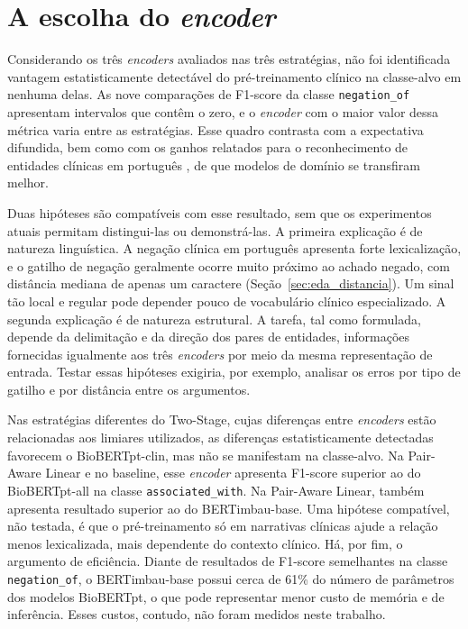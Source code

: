 \section{A escolha do \emph{encoder}}
\label{sec:discussao_encoder}

Considerando os três \emph{encoders} avaliados nas três estratégias, não foi identificada vantagem estatisticamente detectável do pré-treinamento clínico na classe-alvo em nenhuma delas. As nove comparações de F1-score da classe \texttt{negation\_of} apresentam intervalos que contêm o zero, e o \emph{encoder} com o maior valor dessa métrica varia entre as estratégias. Esse quadro
contrasta com a expectativa difundida, bem como com os ganhos relatados para o
reconhecimento de entidades clínicas em português \cite{schneider_2020_biobertpt}, de
que modelos de domínio se transfiram melhor.

Duas hipóteses são compatíveis com esse resultado, sem que os experimentos atuais
permitam distingui-las ou demonstrá-las. A primeira explicação é de natureza linguística. A negação clínica em português apresenta forte lexicalização, e o gatilho de negação geralmente ocorre muito próximo ao achado negado, com distância mediana de apenas um caractere (Seção~\ref{sec:eda_distancia}).
Um sinal tão local e regular pode depender pouco de vocabulário clínico
especializado. A segunda explicação é de natureza estrutural. A tarefa, tal como formulada, depende da delimitação e da direção dos pares de entidades, informações fornecidas igualmente aos três \emph{encoders} por meio da mesma representação de entrada. Testar essas hipóteses exigiria, por exemplo, analisar
os erros por tipo de gatilho e por distância entre os argumentos.

Nas estratégias diferentes do Two-Stage, cujas diferenças entre \emph{encoders} estão relacionadas aos limiares utilizados, as diferenças estatisticamente detectadas favorecem o BioBERTpt-clin, mas não se manifestam na classe-alvo. Na Pair-Aware Linear e no baseline, esse \emph{encoder} apresenta F1-score superior ao do BioBERTpt-all na classe \texttt{associated\_with}. Na Pair-Aware Linear, também apresenta resultado superior ao do BERTimbau-base.
Uma hipótese compatível, não testada, é que o pré-treinamento só em narrativas
clínicas ajude a relação menos lexicalizada, mais dependente do contexto clínico. Há, por fim, o argumento de eficiência. Diante de resultados de F1-score semelhantes na classe \texttt{negation\_of}, o BERTimbau-base possui cerca de 61\% do número de parâmetros dos modelos BioBERTpt, o que pode representar menor custo de memória e de inferência. Esses custos, contudo, não foram medidos neste trabalho.

